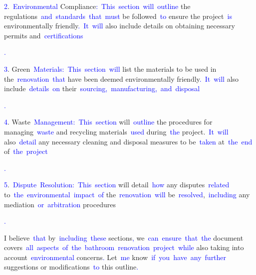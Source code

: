 \documentclass{article}
\begin{document}
\begin{tcolorbox}[colframe=black,colback=white]
{}\textcolor{blue}{2}.\textcolor{blue}{~Environmental} Compliance\textcolor{blue}{:}\textcolor{blue}{~This}\textcolor{blue}{~section}\textcolor{blue}{~will}\textcolor{blue}{~outline} the regulations\textcolor{blue}{~and}\textcolor{blue}{~standards}\textcolor{blue}{~that}\textcolor{blue}{~must} be followed\textcolor{blue}{~to} ensure the project\textcolor{blue}{~is} environmentally friendly\textcolor{blue}{.}\textcolor{blue}{~It}\textcolor{blue}{~will} also include details on obtaining necessary permits and\textcolor{blue}{~certifications}\textcolor{blue}{.

}\textcolor{blue}{3}. Green\textcolor{blue}{~Materials}\textcolor{blue}{:}\textcolor{blue}{~This}\textcolor{blue}{~section}\textcolor{blue}{~will} list the materials to be used in the\textcolor{blue}{~renovation}\textcolor{blue}{~that} have been deemed environmentally friendly\textcolor{blue}{.}\textcolor{blue}{~It}\textcolor{blue}{~will} also include\textcolor{blue}{~details}\textcolor{blue}{~on} their\textcolor{blue}{~sourcing}\textcolor{blue}{,}\textcolor{blue}{~manufacturing}\textcolor{blue}{,}\textcolor{blue}{~and}\textcolor{blue}{~disposal}\textcolor{blue}{.

}\textcolor{blue}{4}. Waste\textcolor{blue}{~Management}\textcolor{blue}{:}\textcolor{blue}{~This}\textcolor{blue}{~section} will\textcolor{blue}{~outline} the procedures for managing\textcolor{blue}{~waste} and recycling materials\textcolor{blue}{~used} during\textcolor{blue}{~the} project.\textcolor{blue}{~It}\textcolor{blue}{~will} also\textcolor{blue}{~detail} any necessary cleaning and disposal measures to be\textcolor{blue}{~taken} at\textcolor{blue}{~the}\textcolor{blue}{~end} of\textcolor{blue}{~the}\textcolor{blue}{~project}\textcolor{blue}{.

}\textcolor{blue}{5}.\textcolor{blue}{~Dis}\textcolor{blue}{pute}\textcolor{blue}{~Resolution}\textcolor{blue}{:}\textcolor{blue}{~This}\textcolor{blue}{~section} will detail\textcolor{blue}{~how} any disputes\textcolor{blue}{~related} to\textcolor{blue}{~the}\textcolor{blue}{~environmental}\textcolor{blue}{~impact}\textcolor{blue}{~of} the\textcolor{blue}{~renovation}\textcolor{blue}{~will} be\textcolor{blue}{~resolved},\textcolor{blue}{~including} any mediation\textcolor{blue}{~or}\textcolor{blue}{~arbitration} procedures\textcolor{blue}{.

}I believe\textcolor{blue}{~that} by\textcolor{blue}{~including}\textcolor{blue}{~these} sections\textcolor{blue}{,} we\textcolor{blue}{~can}\textcolor{blue}{~ensure}\textcolor{blue}{~that}\textcolor{blue}{~the} document covers\textcolor{blue}{~all}\textcolor{blue}{~aspects}\textcolor{blue}{~of}\textcolor{blue}{~the}\textcolor{blue}{~bathroom}\textcolor{blue}{~renovation}\textcolor{blue}{~project}\textcolor{blue}{~while} also taking into account\textcolor{blue}{~environmental} concerns\textcolor{blue}{.} Let\textcolor{blue}{~me} know\textcolor{blue}{~if}\textcolor{blue}{~you}\textcolor{blue}{~have}\textcolor{blue}{~any}\textcolor{blue}{~further} suggestions or modifications\textcolor{blue}{~to} this outline\textcolor{blue}{.}\textcolor{blue}{}
\end{tcolorbox}
\end{document}
